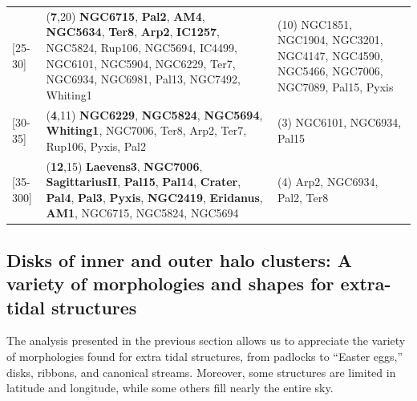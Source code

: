 \begin{table}
\begin{tabularx}{\textwidth}{l X X }
        [25-30] & (\textbf{7},20) \textbf{NGC6715}, \textbf{Pal2}, \textbf{AM4}, \textbf{NGC5634}, \textbf{Ter8}, \textbf{Arp2}, \textbf{IC1257}, NGC5824, Rup106, NGC5694, IC4499, NGC6101, NGC5904, NGC6229, Ter7, NGC6934, NGC6981, Pal13, NGC7492, Whiting1 & (10) NGC1851, NGC1904, NGC3201, NGC4147, NGC4590, NGC5466, NGC7006, NGC7089, Pal15, Pyxis\\ 
        \vspace{0.1cm}

        [30-35] & (\textbf{4},11) \textbf{NGC6229}, \textbf{NGC5824}, \textbf{NGC5694}, \textbf{Whiting1}, NGC7006, Ter8, Arp2, Ter7, Rup106, Pyxis, Pal2 & (3) NGC6101, NGC6934, Pal15\\ 
        \vspace{0.1cm}

        [35-300] & (\textbf{12},15) \textbf{Laevens3}, \textbf{NGC7006}, \textbf{SagittariusII}, \textbf{Pal15}, \textbf{Pal14}, \textbf{Crater}, \textbf{Pal4}, \textbf{Pal3}, \textbf{Pyxis}, \textbf{NGC2419}, \textbf{Eridanus}, \textbf{AM1}, NGC6715, NGC5824, NGC5694 & (4) Arp2, NGC6934, Pal2, Ter8
        \end{tabularx}
        \normalsize
    \end{table}


    \subsection{Disks of inner and outer halo clusters: A variety of morphologies and shapes for extra-tidal structures}\label{sec:morphologies}
        The analysis presented in the previous section allows us to appreciate the variety of morphologies found for extra tidal structures, from padlocks to ``Easter eggs,'' disks, ribbons, and canonical streams. Moreover, some structures are limited in latitude and longitude, while some others fill nearly the entire sky. 

